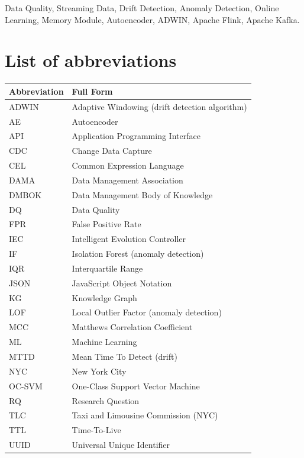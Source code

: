 \documentclass[a4paper, reqno, oneside]{book}
\begin{document}
\vspace{2cm}
 Data Quality, Streaming Data, Drift Detection, Anomaly Detection, Online Learning, Memory Module, Autoencoder, ADWIN, Apache Flink, Apache Kafka.

\newpage
\tableofcontents

\newpage
\listoffigures

\newpage
\listoftables


\chapter*{List of abbreviations}
\vspace{20pt}

\begin{longtable}{|m{2.5cm}|m{10cm}|}
\hline
\textbf{Abbreviation} & \textbf{Full Form} \\ \hline
ADWIN & Adaptive Windowing (drift detection algorithm) \\ \hline
AE & Autoencoder \\ \hline
API & Application Programming Interface \\ \hline
CDC & Change Data Capture \\ \hline
CEL & Common Expression Language \\ \hline
DAMA & Data Management Association \\ \hline
DMBOK & Data Management Body of Knowledge \\ \hline
DQ & Data Quality \\ \hline
FPR & False Positive Rate \\ \hline
IEC & Intelligent Evolution Controller \\ \hline
IF & Isolation Forest (anomaly detection) \\ \hline
IQR & Interquartile Range \\ \hline
JSON & JavaScript Object Notation \\ \hline
KG & Knowledge Graph \\ \hline
LOF & Local Outlier Factor (anomaly detection) \\ \hline
MCC & Matthews Correlation Coefficient \\ \hline
ML & Machine Learning \\ \hline
MTTD & Mean Time To Detect (drift) \\ \hline
NYC & New York City \\ \hline
OC-SVM & One-Class Support Vector Machine \\ \hline
RQ & Research Question \\ \hline
TLC & Taxi and Limousine Commission (NYC) \\ \hline
TTL & Time-To-Live \\ \hline
UUID & Universal Unique Identifier \\ \hline
\end{longtable}
\end{document}
